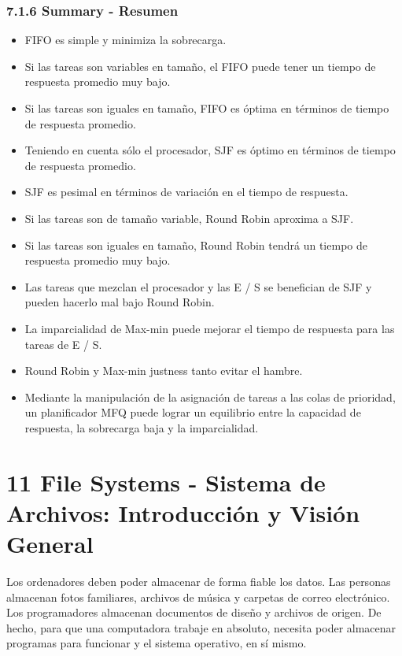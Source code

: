 \documentclass[10pt]{book}
\begin{document}
\subsection{7.1.6 Summary - Resumen}
\begin{itemize}
\item FIFO es simple y minimiza la sobrecarga.
\item Si las tareas son variables en tamaño, el FIFO puede tener un tiempo de respuesta promedio muy bajo.
\item Si las tareas son iguales en tamaño, FIFO es óptima en términos de tiempo de respuesta promedio.
\item Teniendo en cuenta sólo el procesador, SJF es óptimo en términos de tiempo de respuesta promedio.
\item SJF es pesimal en términos de variación en el tiempo de respuesta.
\item Si las tareas son de tamaño variable, Round Robin aproxima a SJF.
\item Si las tareas son iguales en tamaño, Round Robin tendrá un tiempo de respuesta promedio muy bajo.
\item Las tareas que mezclan el procesador y las E / S se benefician de SJF y pueden hacerlo mal bajo Round Robin.
\item La imparcialidad de Max-min puede mejorar el tiempo de respuesta para las tareas de E / S.
\item Round Robin y Max-min justness tanto evitar el hambre.
\item Mediante la manipulación de la asignación de tareas a las colas de prioridad, un planificador MFQ puede lograr un equilibrio entre la capacidad de respuesta, la sobrecarga baja y la imparcialidad.
\end{itemize}

\chapter{11 File Systems - Sistema de Archivos: Introducción y Visión General}
Los ordenadores deben poder almacenar de forma fiable los datos. Las personas almacenan fotos familiares, archivos de música y carpetas de correo electrónico. Los programadores almacenan documentos de diseño y archivos de origen. De hecho, para que una computadora trabaje en absoluto, necesita poder almacenar programas para funcionar y el sistema operativo, en sí mismo.
\end{document}

